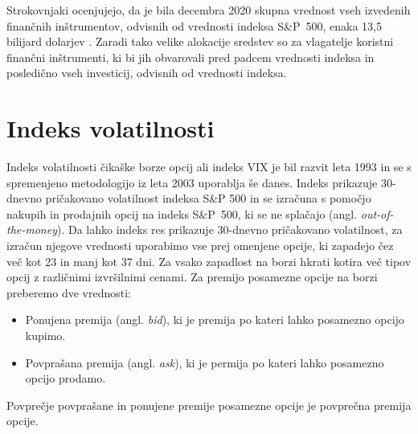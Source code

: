 \documentclass[12pt,a4paper, reqno]{amsart}
\theoremstyle{definition} %
\theoremstyle{plain} %
\begin{document}
Strokovnjaki ocenjujejo, da je bila decembra 2020 skupna vrednost vseh izvedenih finančnih inštrumentov, odvisnih od vrednosti indeksa S\&P~500, enaka 13,5 bilijard dolarjev \cite{spx_cap}. Zaradi tako velike alokacije sredstev so za vlagatelje koristni finančni inštrumenti, ki bi jih obvarovali pred padcem vrednosti indeksa in posledično vseh investicij, odvisnih od vrednosti indeksa.


\section{Indeks volatilnosti}
Indeks volatilnosti čikaške borze opcij ali indeks VIX je bil razvit leta 1993 in se s spremenjeno metodologijo iz leta 2003 uporablja še danes. Indeks prikazuje 30-dnevno pričakovano volatilnost indeksa S\&P 500  in se izračuna s pomočjo nakupih in prodajnih opcij na indeks S\&P~500, ki se ne splačajo (angl. \textit{out-of-the-money}). Da lahko indeks res prikazuje 30-dnevno pričakovano volatilnost, za izračun njegove vrednosti uporabimo vse prej omenjene opcije, ki zapadejo čez več kot 23 in manj kot 37 dni. Za vsako zapadlost na borzi hkrati kotira več tipov opcij z različnimi izvršilnimi cenami. Za premijo posamezne opcije na borzi preberemo dve vrednosti:
\begin{itemize}
\item Ponujena premija (angl. \textit{bid}), ki je premija po kateri lahko posamezno opcijo kupimo.\\

\item Povprašana premija (angl. \textit{ask}), ki je permija po kateri lahko posamezno opcijo prodamo.\\
\end{itemize}
Povprečje povprašane in ponujene premije posamezne opcije je povprečna premija opcije.
\end{document}
